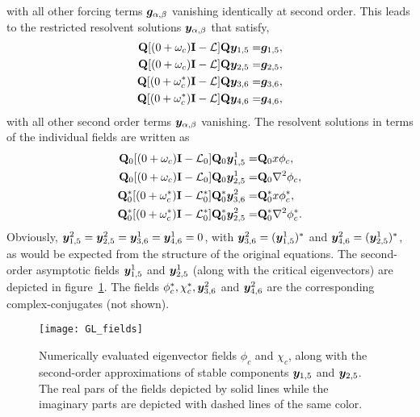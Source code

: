 with all other forcing terms $\boldsymbol{g}_{\alpha,\beta}$ vanishing identically at second order. This leads to the restricted resolvent solutions $\boldsymbol{y}_{\alpha,\beta}$ that satisfy,
 \begin{subequations}
 	\label{eqn:GL_resolvents}
	 \begin{align}
	 	\mathbf{Q}[(0 + \omega_{c})\mathbf{I} - \mathcal{L}]\mathbf{Q}\boldsymbol{y}_{1,5} =& \boldsymbol{g}_{1,5}, \\
	 	\mathbf{Q}[(0 + \omega_{c})\mathbf{I} - \mathcal{L}]\mathbf{Q}\boldsymbol{y}_{2,5} =& \boldsymbol{g}_{2,5}, \\
	 	\mathbf{Q}[(0 + \omega^{*}_{c})\mathbf{I} - \mathcal{L}]\mathbf{Q}\boldsymbol{y}_{3,6} =& \boldsymbol{g}_{3,6}, \\
	 	\mathbf{Q}[(0 + \omega^{*}_{c})\mathbf{I} - \mathcal{L}]\mathbf{Q}\boldsymbol{y}_{4,6} =& \boldsymbol{g}_{4,6}, 
	 \end{align}
\end{subequations}
with all other second order terms $\boldsymbol{y}_{\alpha,\beta}$ vanishing. The resolvent solutions in terms of the individual fields are written as
 \begin{subequations}
 	\label{eqn:GL_sub_resolvents}
	 \begin{align}
	 	\mathbf{Q}_{0}[(0 + \omega_{c})\mathbf{I} - \mathcal{L}_{0}]\mathbf{Q}_{0}\boldsymbol{y}^{1}_{1,5} =& \mathbf{Q}_{0}x\phi_{c}, \\
	 	\mathbf{Q}_{0}[(0 + \omega_{c})\mathbf{I} - \mathcal{L}_{0}]\mathbf{Q}_{0}\boldsymbol{y}^{1}_{2,5} =& \mathbf{Q}_{0}\nabla^{2}\phi_{c}, \\
	 	\mathbf{Q}^{*}_{0}[(0 + \omega^{*}_{c})\mathbf{I} - \mathcal{L}^{*}_{0}]\mathbf{Q}^{*}_{0}\boldsymbol{y}^{2}_{3,6} =& \mathbf{Q}^{*}_{0}x\phi^{*}_{c}, \\
		\mathbf{Q}^{*}_{0}[(0 + \omega^{*}_{c})\mathbf{I} - \mathcal{L}^{*}_{0}]\mathbf{Q}^{*}_{0}\boldsymbol{y}^{2}_{2,5} =& \mathbf{Q}^{*}_{0}\nabla^{2}\phi^{*}_{c}.
	 \end{align}
\end{subequations}
 Obviously, $\boldsymbol{y}^{2}_{1,5} = \boldsymbol{y}^{2}_{2,5} = \boldsymbol{y}^{1}_{3,6} = \boldsymbol{y}^{1}_{4,6} = 0$, with
 $\boldsymbol{y}^{2}_{3,6} = (\boldsymbol{y}^{1}_{1,5})^{*}$ and $\boldsymbol{y}^{2}_{4,6} = (\boldsymbol{y}^{1}_{2,5})^{*}$, as would be expected from the structure of the original equations. The second-order asymptotic fields $\boldsymbol{y}^{1}_{1,5}$ and $\boldsymbol{y}^{1}_{2,5}$ (along with the critical eigenvectors) are depicted in figure~\ref{fig:GL_fields}. The fields $\phi^{*}_{c}, \chi^{*}_{c},\boldsymbol{y}^{2}_{3,6}$ and $\boldsymbol{y}^{2}_{4,6}$ are the corresponding complex-conjugates (not shown). 
\begin{figure}
	\centering
	\texttt{[image: GL\_fields]}
	\caption{Numerically evaluated eigenvector fields $\phi_{c}$ and $\chi_{c}$, along with the second-order approximations of stable components $\boldsymbol{y}_{1,5}$ and $\boldsymbol{y}_{2,5}$. The real pars of the fields depicted by solid lines while the imaginary parts are depicted with dashed lines of the same color.}
	\label{fig:GL_fields}
\end{figure} 

